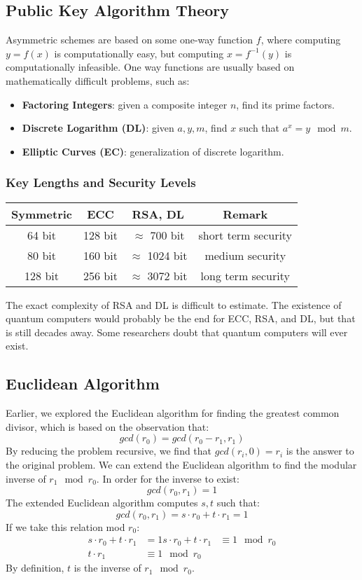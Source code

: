 \documentclass{math}
\begin{document}
\subsection*{Public Key Algorithm Theory}
Asymmetric schemes are based on some one-way function \( f \), where computing
\( y = f(x) \) is computationally easy, but computing \( x = f^{-1}(y) \) is
computationally infeasible. One way functions are usually based on
mathematically difficult problems, such as:
\begin{itemize}
  \item \textbf{Factoring Integers}: given a composite integer \( n \), find its
  prime factors.
  \item \textbf{Discrete Logarithm (DL)}: given \( a,y,m \), find \( x \) such
  that \( a^x = y\mod m \).
  \item \textbf{Elliptic Curves (EC)}: generalization of discrete logarithm.
\end{itemize}

\subsubsection*{Key Lengths and Security Levels}
\begin{center}
  \begin{tabular}{|c|c|c|c|}
    \hline
    Symmetric & ECC & RSA, DL & Remark \\
    \hline
    64 bit & 128 bit & \( \approx \) 700 bit & short term security \\
    \hline
    80 bit & 160 bit & \( \approx \) 1024 bit & medium security \\
    \hline
    128 bit & 256 bit & \( \approx \) 3072 bit &  long term security \\
    \hline
  \end{tabular}
\end{center}
The exact complexity of RSA and DL is difficult to estimate. The existence of
quantum computers would probably be the end for ECC, RSA, and DL, but that is
still decades away. Some researchers doubt that quantum computers will ever
exist.

\subsection*{Euclidean Algorithm}
Earlier, we explored the Euclidean algorithm for finding the greatest common
divisor, which is based on the observation that:
\[ gcd(r_0) = gcd(r_0-r_1,r_1) \]
By reducing the problem recursive, we find that \( gcd(r_i,0) = r_i \) is the
answer to the original problem. We can extend the Euclidean algorithm to find
the modular inverse of \( r_1 \mod r_0 \). In order for the inverse to exist:
\[ gcd(r_0,r_1) = 1 \]
The extended Euclidean algorithm computes \( s,t \) such that:
\[ gcd(r_0,r_1) = s\cdot r_0+t\cdot r_1 = 1 \]
If we take this relation mod \( r_0 \):
\begin{align*}
  s\cdot r_0+t\cdot r_1 &= 1
  s\cdot r_0+t\cdot r_1 &\equiv 1\mod r_0 \\
  t\cdot r_1 &\equiv 1\mod r_0
\end{align*}
By definition, \( t \) is the inverse of \( r_1 \mod r_0 \).
\end{document}
